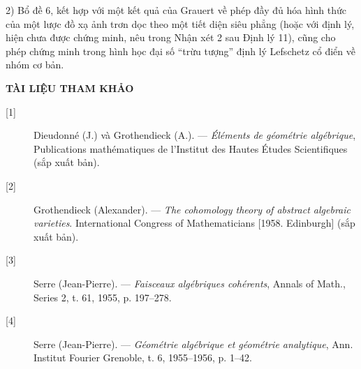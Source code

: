 2) Bổ đề 6, kết hợp với một kết quả của Grauert về phép đầy đủ hóa hình thức
của một lược đồ xạ ảnh trơn dọc theo một tiết diện siêu phẳng (hoặc với định
lý, hiện chưa được chứng minh, nêu trong Nhận xét 2 sau Định lý 11), cũng cho
phép chứng minh trong hình học đại số “trừu tượng” định lý Lefschetz cổ điển về
nhóm cơ bản.

\begin{center}
  \textbf{TÀI LIỆU THAM KHẢO}
\end{center}

\begin{description}
  \item[{[1]}] Dieudonné (J.) và Grothendieck (A.). --- \emph{Éléments de
    géométrie algébrique}, Publications mathématiques de l'Institut des Hautes
    Études Scientifiques (sắp xuất bản).
  \item[{[2]}] Grothendieck (Alexander). --- \emph{The cohomology theory of
    abstract algebraic varieties}. International Congress of Mathematicians
    [1958. Edinburgh] (sắp xuất bản).
  \item[{[3]}] Serre (Jean-Pierre). --- \emph{Faisceaux algébriques
    cohérents}, Annals of Math., Series 2, t. 61, 1955, p. 197--278.
  \item[{[4]}] Serre (Jean-Pierre). --- \emph{Géométrie algébrique et
    géométrie analytique}, Ann. Institut Fourier Grenoble, t. 6, 1955--1956,
    p. 1--42.
\end{description}

\par
